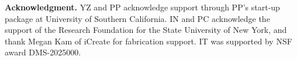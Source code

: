\documentclass[aps,prl,twocolumn,superscriptaddress]{revtex4-1}
\begin{document}



















\textbf{Acknowledgment.} YZ and PP acknowledge support through PP's start-up package at University of Southern California. IN and PC acknowledge the support of the Research Foundation for the State University of New York, and thank Megan Kam of iCreate for fabrication support. IT was supported by NSF award DMS-2025000.




% 

\end{document}
